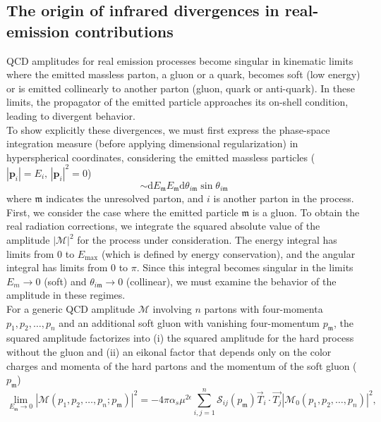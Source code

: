 \documentclass[a4paper, 12pt]{book}
\newcommand{\um}{\mathfrak{m}}
\begin{document}
\subsection{The origin of infrared divergences in real-emission contributions}
QCD amplitudes for real emission processes become singular in kinematic limits where the emitted massless parton, a gluon or a quark, becomes soft (low energy) or is emitted collinearly to another parton (gluon, quark or anti-quark). In these limits, the propagator of the emitted particle approaches its on-shell condition, leading to divergent behavior. \\
To show explicitly these divergences, we must first express the phase-space integration measure (before applying dimensional regularization) in hyperspherical coordinates, considering the emitted massless particles ($|\mathbf{p}_i|=E_i, \, |\mathbf{p}_i|^2=0$)
\begin{equation}
    [\mathrm{d}p_\mathfrak{m}] \sim \mathrm{d}E_\um E_\um \mathrm{d}\theta_{i\um} \sin{\theta_{i\um}}
\end{equation}
where $\um$ indicates the unresolved parton, and $i$ is another parton in the process. \\
First, we consider the case where the emitted particle $\um$ is a gluon. To obtain the real radiation corrections, we integrate the squared absolute value of the amplitude $|\mathcal{M}|^2$ for the process under consideration. The energy integral has limits from $0$ to $E_\mathrm{max}$ (which is defined by energy conservation), and the angular integral has limits from $0$ to $\pi$. Since this integral becomes singular in the limits $E_m \rightarrow 0$ (soft) and $\theta_{i\um} \rightarrow 0$ (collinear), we must examine the behavior of the amplitude in these regimes. \\
For a generic QCD amplitude $\mathcal{M}$ involving $n$ partons with four-momenta $p_1, p_2, \dots, p_n$ and an additional soft gluon with vanishing four-momentum $p_\um$, the squared amplitude factorizes into (i) the squared amplitude for the hard process without the gluon and (ii) an eikonal factor that depends only on the color charges and momenta of the hard partons and the momentum of the soft gluon ($p_\um$) \cite{Catani:1999ss}
\begin{equation}
    \lim_{E_\um \rightarrow 0}|\mathcal{M}(p_1, p_2, \dots, p_n; p_\um)|^2= - 4\pi \alpha_s \mu^{2\epsilon} \sum_{i,j=1}^n \mathcal{S}_{ij}(p_\um) \vec{T}_i \cdot \vec{T_j} |\mathcal{M}_0(p_1, p_2, \dots, p_n)|^2,
\end{equation}
\end{document}
